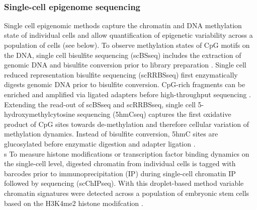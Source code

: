 \\


\subsubsection{Single-cell epigenome sequencing}

Single cell epigenomic methods capture the chromatin and DNA methylation state of individual cells and allow quantification of epigenetic variability across a population of cells (see below)\citep{Clark2016}. To observe methylation states of CpG motifs on the DNA, single cell bisulfite sequencing (scBSseq) includes the extraction of genomic DNA and bisulfite conversion prior to library preparation \citep{Smallwood2014, Farlik2015}. Single cell reduced representation bisulfite sequencing (scRRBSseq) first enzymatically digests genomic DNA prior to bisulfite conversion. CpG-rich fragments can be enriched and amplified via ligated adapters before high-throughput sequencing \citep{Guo2013}. Extending the read-out of scBSseq and scRRBSseq, single cell 5-hydroxymethylcytosine sequencing (5hmCseq) captures the first oxidative product of CpG sites towards de-methylation and therefore cellular variation of methylation dynamics. Instead of bisulfite conversion, 5hmC sites are glucosylated before enzymatic digestion and adapter ligation \citep{Mooijman2016}. \\s
To measure histone modifications or transcription factor binding dynamics on the single-cell level, digested chromatin from individual cells is tagged with barcodes prior to immunoprecipitation (IP) during single-cell chromatin IP followed by sequencing (scChIPseq). With this droplet-based method variable chromatin signatures were detected across a population of embryonic stem cells based on the H3K4me2 histone modifcation \citep{Rotem2015}. \\ 
